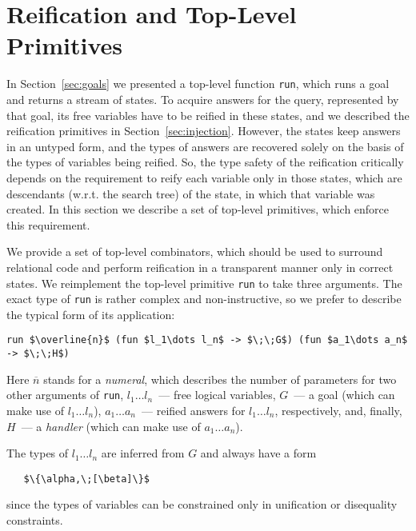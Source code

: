 \section{Reification and Top-Level Primitives}
\label{sec:reification}

In Section~\ref{sec:goals} we presented a top-level function \lstinline{run}, which
runs a goal and returns a stream of states. To acquire answers for the query, 
represented by that goal, its free variables have to be reified in these states, and
we described the reification primitives in Section~\ref{sec:injection}. However, 
the states keep answers in an untyped form, and the types of answers are
recovered solely on the basis of the types of variables being reified. So, the 
type safety of the reification critically depends on the requirement to
reify each variable only in those states, which are descendants (w.r.t. the search tree)
of the state, in which that variable was created. In this section we describe a set of
top-level primitives, which enforce this requirement.

We provide a set of top-level combinators, which should be used to surround relational code
and perform reification in a transparent manner only in correct states.
We reimplement the top-level primitive \lstinline{run} to take three
arguments. The exact type of \lstinline{run} is rather complex and non-instructive,
so we prefer to describe the typical form of its application:

\begin{lstlisting}[mathescape=true]
   run $\overline{n}$ (fun $l_1\dots l_n$ -> $\;\;G$) (fun $a_1\dots a_n$ -> $\;\;H$)
\end{lstlisting}

Here $\overline{n}$ stands for a \emph{numeral}, which describes the number of
parameters for two other arguments of \lstinline{run}, \mbox{$l_1\dots l_n$}~---
free logical variables, $G$~--- a goal (which can make use of \mbox{$l_1\dots l_n$}),
\mbox{$a_1\dots a_n$}~--- reified answers for \mbox{$l_1\dots l_n$}, respectively, and,
finally, $H$~--- a \emph{handler} (which can make use of \mbox{$a_1\dots a_n$}).

The types of \mbox{$l_1\dots l_n$} are inferred from $G$ and always have a form

\begin{lstlisting}
   $\{\alpha,\;[\beta]\}$
\end{lstlisting}

\noindent since the types of variables can be constrained only in unification or disequality constraints.


